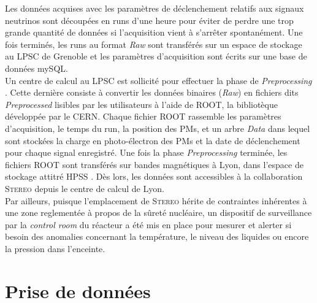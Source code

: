 Les données acquises avec les paramètres de déclenchement relatifs aux signaux neutrinos sont découpées en runs d'une heure pour éviter de perdre une trop grande quantité de données si l'acquisition vient à s'arrêter spontanément. Une fois terminés, les runs au format \og \textit{Raw} \fg{} sont transférés sur un espace de stockage au LPSC de Grenoble et les paramètres d'acquisition sont écrits sur une base de données mySQL.\\ 

Un centre de calcul au LPSC est sollicité pour effectuer la phase de \og \textit{Preprocessing} \fg{}. Cette dernière consiste à convertir les données binaires (\textit{Raw}) en fichiers dits \og \textit{Preprocessed} \fg{} lisibles par les utilisateurs à l'aide de ROOT, la bibliotèque développée par le CERN. Chaque fichier ROOT rassemble les paramètres d'acquisition, le temps du run, la position des PMs, et un arbre \og \textit{Data} \fg{} dans lequel sont stockées la charge en photo-électron des PMs et la date de déclenchement pour chaque signal enregistré. Une fois la phase \textit{Preprocessing} terminée, les fichiers ROOT sont transférés sur bandes magnétiques à Lyon, dans l'espace de stockage attitré \og HPSS \fg{}. Dès lors, les données sont accessibles à la collaboration \textsc{Stereo} depuis le centre de calcul de Lyon.\\ 

Par ailleurs, puisque l'emplacement de \textsc{Stereo} hérite de contraintes inhérentes à une zone reglementée à propos de la sûreté nucléaire, un dispositif de surveillance par la \textit{control room} du réacteur a été mis en place pour mesurer et alerter si besoin des anomalies concernant la température, le niveau des liquides ou encore la pression dans l'enceinte.\\


\bigbreak 

\section{Prise de données} 

